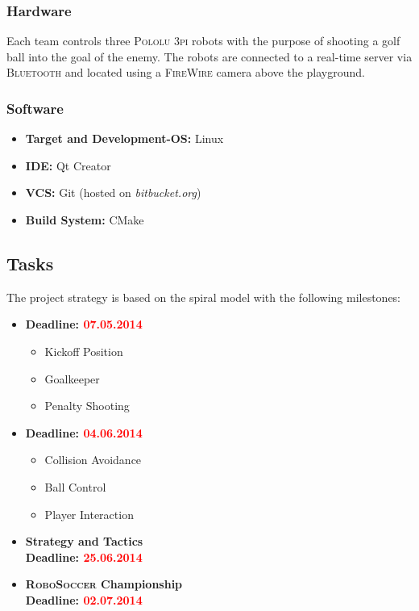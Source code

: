 \documentclass[12pt]{article}
\begin{document}
\subsubsection*{Hardware}
Each team controls three  \textsc{Pololu 3pi} robots with the purpose of shooting a golf ball into the goal of the enemy.
The robots are connected to a real-time server via \textsc{Bluetooth} and located using a \textsc{FireWire} camera above the playground.

\subsubsection*{Software}
\begin{itemize}
	\item \textbf{Target and Development-OS:} Linux
	\item \textbf{IDE:} Qt Creator
	\item \textbf{VCS:} Git (hosted on \textit{bitbucket.org})
	\item \textbf{Build System:} CMake
\end{itemize}

\subsection{Tasks}
The project strategy is based on the spiral model with the following milestones:
\begin{itemize}
	\item \textbf{Deadline: \textcolor{red}{07.05.2014}}
	\begin{itemize}
		\item Kickoff Position
		\item Goalkeeper
		\item Penalty Shooting
	\end{itemize}
	
	\item \textbf{Deadline: \textcolor{red}{04.06.2014}}
	\begin{itemize}
		\item Collision Avoidance
		\item Ball Control
		\item Player Interaction
	\end{itemize}
	
	\item \textbf{Strategy and Tactics}\\
	\textbf{Deadline: \textcolor{red}{25.06.2014}}
	
	\item \textbf{\textsc{RoboSoccer} Championship}\\
	\textbf{Deadline: \textcolor{red}{02.07.2014}}
\end{itemize}
\end{document}
